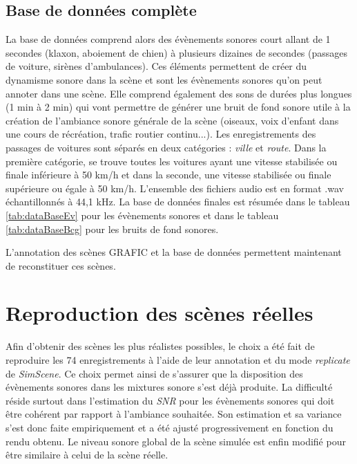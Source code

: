 \subsection{Base de données complète}
La base de données comprend alors des évènements sonores court allant de 1 secondes (klaxon, aboiement de chien) à plusieurs dizaines de secondes (passages de voiture, sirènes d'ambulances). Ces éléments permettent de créer du dynamisme sonore dans la scène et sont les évènements sonores qu'on peut annoter dans une scène. Elle comprend également des sons de durées plus longues (1 min à 2 min) qui vont permettre de générer une bruit de fond sonore utile à la création de l'ambiance sonore générale de la scène (oiseaux, voix d'enfant dans une cours de récréation, trafic routier continu...). Les enregistrements des passages de voitures sont séparés en deux catégories : \textit{ville} et \textit{route}. Dans la première catégorie, se trouve toutes les voitures ayant une vitesse stabilisée ou finale inférieure à 50 km/h et dans la seconde, une vitesse stabilisée ou finale supérieure ou égale à 50 km/h. L'ensemble des fichiers audio est en format .wav échantillonnés à 44,1 kHz. La base de données finales est résumée dans le tableau \ref{tab:dataBaseEv} pour les évènements sonores et dans le tableau \ref{tab:dataBaseBcg} pour les bruits de fond sonores. 



L'annotation des scènes GRAFIC et la base de données permettent maintenant de reconstituer ces scènes.

\section{Reproduction des scènes réelles}

Afin d'obtenir des scènes les plus réalistes possibles, le choix a été fait de reproduire les 74 enregistrements à l'aide de leur annotation et du mode \textit{replicate} de \textit{SimScene}. Ce choix permet ainsi de s'assurer que la disposition des évènements sonores dans les mixtures sonore s'est déjà produite. La difficulté réside surtout dans l'estimation du \textit{SNR} pour les évènements sonores qui doit être cohérent par rapport à l'ambiance souhaitée. Son estimation et sa variance s'est donc faite empiriquement et a été ajusté progressivement en fonction du rendu obtenu. Le niveau sonore global de la scène simulée est enfin modifié pour être similaire à celui de la scène réelle.\\

